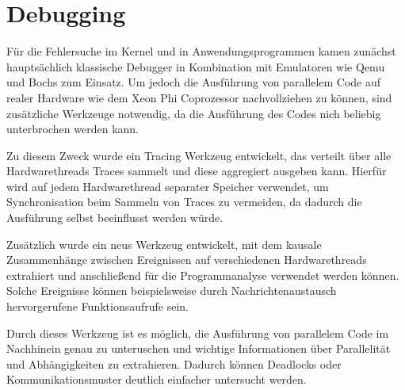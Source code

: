\section{Debugging}
Für die Fehlersuche im Kernel und in Anwendungsprogrammen kamen zunächst
hauptsächlich klassische Debugger in Kombination mit Emulatoren wie Qemu und
Bochs zum Einsatz. Um jedoch die Ausführung von parallelem Code auf realer
Hardware wie dem Xeon Phi Coprozessor nachvollziehen zu können, sind zusätzliche
Werkzeuge notwendig, da die Ausführung des Codes nich beliebig unterbrochen
werden kann.

Zu diesem Zweck wurde ein Tracing Werkzeug entwickelt, das verteilt über alle
Hardwarethreads Traces sammelt und diese aggregiert ausgeben kann. Hierfür wird
auf jedem Hardwarethread separater Speicher verwendet, um Synchronisation beim
Sammeln von Traces zu vermeiden, da dadurch die Ausführung selbst beeinflusst
werden würde.

Zusätzlich wurde ein neus Werkzeug entwickelt, mit dem kausale Zusammenhänge
zwischen Ereignissen auf verschiedenen Hardwarethreads extrahiert und
anschließend für die Programmanalyse verwendet werden können. Solche Ereignisse
können beispielsweise durch Nachrichtenaustausch hervorgerufene Funktionsaufrufe
sein.

Durch dieses Werkzeug ist es möglich, die Ausführung von parallelem Code im
Nachhinein genau zu unteruschen und wichtige Informationen über Parallelität und
Abhängigkeiten zu extrahieren. Dadurch können Deadlocks oder
Kommunikationsmuster deutlich einfacher untersucht werden.

% 
% 



